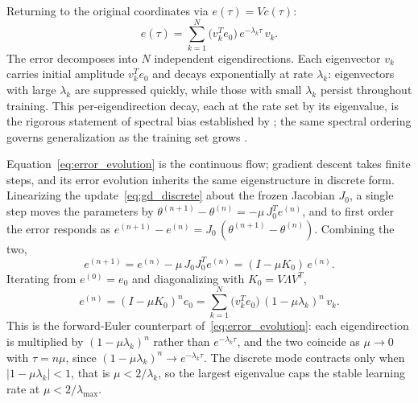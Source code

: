 Returning to the original coordinates via $e(\tau) = Vc(\tau)$:
\begin{equation}\label{eq:error_evolution}
    e(\tau) = \sum_{k=1}^{N} \bigl(v_k^T e_0\bigr)\,e^{-\lambda_k\tau}\,v_k.
\end{equation}
The error decomposes into $N$ independent eigendirections. Each eigenvector $v_k$ carries initial amplitude $v_k^T e_0$ and decays exponentially at rate $\lambda_k$: eigenvectors with large $\lambda_k$ are suppressed quickly, while those with small $\lambda_k$ persist throughout training. This per-eigendirection decay, each at the rate set by its eigenvalue, is the rigorous statement of spectral bias established by \textcite{cao2019}; the same spectral ordering governs generalization as the training set grows \parencite{bordelon2020}.

Equation~\eqref{eq:error_evolution} is the continuous flow; gradient descent takes finite steps, and its error evolution inherits the same eigenstructure in discrete form. Linearizing the update~\eqref{eq:gd_discrete} about the frozen Jacobian $J_0$, a single step moves the parameters by $\theta^{(n+1)} - \theta^{(n)} = -\mu\,J_0^T e^{(n)}$, and to first order the error responds as $e^{(n+1)} - e^{(n)} = J_0\,(\theta^{(n+1)} - \theta^{(n)})$. Combining the two,
\begin{equation}\label{eq:error_discrete_step}
    e^{(n+1)} = e^{(n)} - \mu\,J_0 J_0^T e^{(n)} = (I - \mu K_0)\,e^{(n)}.
\end{equation}
Iterating from $e^{(0)} = e_0$ and diagonalizing with $K_0 = V\Lambda V^T$,
\begin{equation}\label{eq:error_discrete}
    e^{(n)} = (I - \mu K_0)^n e_0 = \sum_{k=1}^N \bigl(v_k^T e_0\bigr)\,(1 - \mu\lambda_k)^n\,v_k.
\end{equation}
This is the forward-Euler counterpart of~\eqref{eq:error_evolution}: each eigendirection is multiplied by $(1-\mu\lambda_k)^n$ rather than $e^{-\lambda_k\tau}$, and the two coincide as $\mu\to0$ with $\tau = n\mu$, since $(1-\mu\lambda_k)^n \to e^{-\lambda_k\tau}$. The discrete mode contracts only when $|1-\mu\lambda_k| < 1$, that is $\mu < 2/\lambda_k$, so the largest eigenvalue caps the stable learning rate at $\mu < 2/\lambda_{\max}$.

